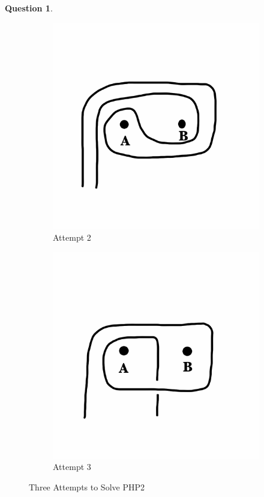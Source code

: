 \documentclass[12pt,letterpaper]{article}
\theoremstyle{definition}
\newtheorem{question}{Question}
\begin{document}
\begin{question}
\begin{figure}[h!]
\begin{subfigure}[b]{0.3\textwidth}
        \includegraphics[width=\textwidth]{phppics/attempt2.png}
        \caption{Attempt 2}
    \end{subfigure}
    \begin{subfigure}[b]{0.3\textwidth}
        \includegraphics[width=\textwidth]{phppics/attempt3.png}
        \caption{Attempt 3}
    \end{subfigure}
    \caption{Three Attempts to Solve PHP2}
\end{figure}
\end{question}
\end{document}
